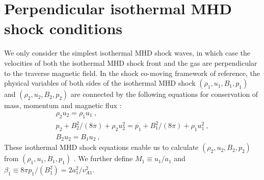 \documentclass[fleqn,usenatbib]{mnras}
\begin{document}


\section{Perpendicular isothermal MHD shock conditions}
\label{s3}
We only consider the simplest isothermal MHD shock waves, in which case the velocities of both the isothermal MHD shock front and the gas are perpendicular to the traverse magnetic field. In the shock co-moving framework of reference, the physical variables of both sides of the isothermal MHD shock $(\rho_{1}, u_{1}, B_{1}, p_{1})$ and $(\rho_{2}, u_{2}, B_{2}, p_{2})$ are connected by the following equations for conservation of mass, momentum and magnetic flux \citep{yuLou2006}:
\begin{gather}
\rho_{2}u_{2}=\rho_{1}u_{1}\ ,\label{e30}\\
p_{2}+B_{2}^{2}/(8\pi)+\rho_{2}u_{2}^{2}
 =p_{1}+B_{1}^{2}/(8\pi)+\rho_{1}u_{1}^{2}\ ,\label{e31}\\
B_{2}u_{2}=B_{1}u_{2}\ ,\label{e32}
\end{gather}
These isothermal MHD shock equations enable us to calculate $(\rho_{2}, u_{2}, B_{2}, p_{2})$ from $(\rho_{1}, u_{1}, B_{1}, p_{1})$ .
We further define $M_{1}\equiv u_{1}/a_{1}$ and $\beta_{1}\equiv 8\pi p_{1}/\left(B_{1}^{2}\right)=2a_{1}^{2}/v_{A1}^{2}$. 
\end{document}
